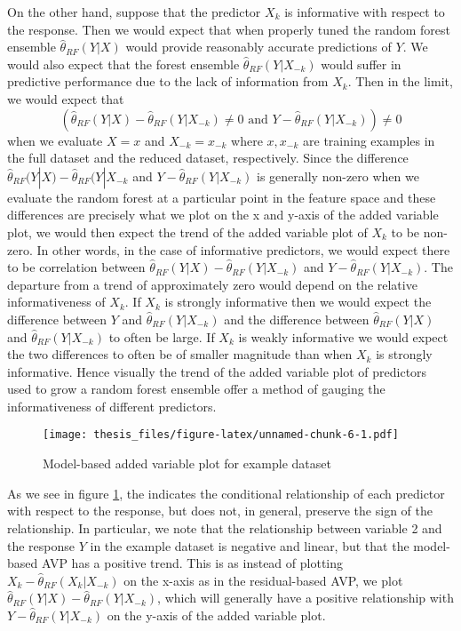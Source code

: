 \documentclass[12pt,twoside]{reedthesis}
\theoremstyle{definition}
\theoremstyle{definition}
\theoremstyle{definition}
\theoremstyle{remark}
\begin{document}
On the other hand, suppose that the predictor \(X_k\) is informative
with respect to the response. Then we would expect that when properly
tuned the random forest ensemble \(\hat{\theta}_{RF}(Y|X)\) would
provide reasonably accurate predictions of \(Y\). We would also expect
that the forest ensemble \(\hat{\theta}_{RF}(Y|X_{-k})\) would suffer in
predictive performance due to the lack of information from \(X_k\). Then
in the limit, we would expect that
\[(\hat{\theta}_{RF}(Y|X)-\hat{\theta}_{RF}(Y|X_{-k})\neq 0 \text{ and } Y-\hat{\theta}_{RF}(Y|X_{-k}))\neq 0\]
when we evaluate \(X=x\) and \(X_{-k}=x_{-k}\) where \(x,x_{-k}\) are
training examples in the full dataset and the reduced dataset,
respectively. Since the difference
\(\hat{\theta}_{RF}(Y|X)-\hat{\theta}_{RF}(Y|X_{-k}\) and
\(Y-\hat{\theta}_{RF}(Y|X_{-k})\) is generally non-zero when we evaluate
the random forest at a particular point in the feature space and these
differences are precisely what we plot on the x and y-axis of the added
variable plot, we would then expect the trend of the added variable plot
of \(X_k\) to be non-zero. In other words, in the case of informative
predictors, we would expect there to be correlation between
\(\hat{\theta}_{RF}(Y|X)-\hat{\theta}_{RF}(Y|X_{-k})\) and
\(Y-\hat{\theta}_{RF}(Y|X_{-k})\). The departure from a trend of
approximately zero would depend on the relative informativeness of
\(X_k\). If \(X_k\) is strongly informative then we would expect the
difference between \(Y\) and \(\hat{\theta}_{RF}(Y|X_{-k})\) and the
difference between \(\hat{\theta}_{RF}(Y|X)\) and
\(\hat{\theta}_{RF}(Y|X_{-k})\) to often be large. If \(X_k\) is weakly
informative we would expect the two differences to often be of smaller
magnitude than when \(X_k\) is strongly informative. Hence visually the
trend of the added variable plot of predictors used to grow a random
forest ensemble offer a method of gauging the informativeness of
different predictors. \par
\begin{figure}
\centering
\texttt{[image: thesis\_files/figure-latex/unnamed-chunk-6-1.pdf]}
\caption{\label{fig:unnamed-chunk-6}\label{AVPmodex}Model-based added
variable plot for example dataset}
\end{figure}
As we see in figure \ref{AVPmodex}, the indicates the conditional
relationship of each predictor with respect to the response, but does
not, in general, preserve the sign of the relationship. In particular,
we note that the relationship between variable 2 and the response \(Y\)
in the example dataset is negative and linear, but that the model-based
AVP has a positive trend. This is as instead of plotting
\(X_k-\hat{\theta}_{RF}(X_k|X_{-k})\) on the x-axis as in the
residual-based AVP, we plot
\(\hat{\theta}_{RF}(Y|X)-\hat{\theta}_{RF}(Y|X_{-k})\), which will
generally have a positive relationship with
\(Y-\hat{\theta}_{RF}(Y|X_{-k})\) on the y-axis of the added variable
plot. \par 
\end{document}
